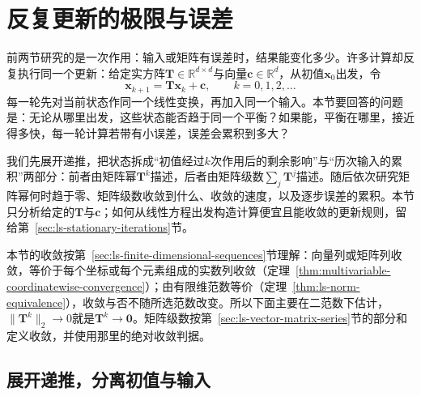 
\section{反复更新的极限与误差}
\label{sec:ls-convergence}
\label{sec:linear-algebra-convergence-approximation}

前两节研究的是一次作用：输入或矩阵有误差时，结果能变化多少。许多计算却反复执行同一个更新：给定实方阵$\bm T\in\mathbb R^{d\times d}$与向量$\bm c\in\mathbb R^d$，从初值$\bm x_0$出发，令
\[
 \bm x_{k+1}=\bm T\bm x_k+\bm c,\qquad k=0,1,2,\ldots
\]
每一轮先对当前状态作同一个线性变换，再加入同一个输入。本节要回答的问题是：无论从哪里出发，这些状态能否趋于同一个平衡？如果能，平衡在哪里，接近得多快，每一轮计算若带有小误差，误差会累积到多大？

我们先展开递推，把状态拆成“初值经过$k$次作用后的剩余影响”与“历次输入的累积”两部分：前者由矩阵幂$\bm T^k$描述，后者由矩阵级数$\sum_j\bm T^j$描述。随后依次研究矩阵幂何时趋于零、矩阵级数收敛到什么、收敛的速度，以及逐步误差的累积。本节只分析给定的$\bm T$与$\bm c$；如何从线性方程出发构造计算便宜且能收敛的更新规则，留给第~\ref{sec:ls-stationary-iterations}节。

本节的收敛按第~\ref{sec:ls-finite-dimensional-sequences}节理解：向量列或矩阵列收敛，等价于每个坐标或每个元素组成的实数列收敛（定理~\ref{thm:multivariable-coordinatewise-convergence}）；由有限维范数等价（定理~\ref{thm:ls-norm-equivalence}），收敛与否不随所选范数改变。所以下面主要在二范数下估计，$\lVert\bm T^k\rVert_2\to0$就是$\bm T^k\to\bm0$。矩阵级数按第~\ref{sec:ls-vector-matrix-series}节的部分和定义收敛，并使用那里的绝对收敛判据。

\subsection{展开递推，分离初值与输入}
\label{sec:ls-affine-iteration-unrolling}

